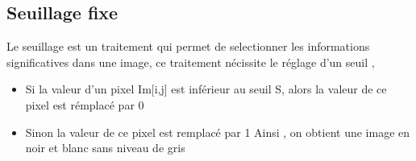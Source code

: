 \documentclass[letterpaper,10pt,english]{jupyterBook}
\begin{document}
\begin{sphinxVerbatimOutput}

\begin{sphinxVerbatim}
\end{sphinxVerbatim}

\noindent{}
\end{sphinxVerbatimOutput}


\subsection{Seuillage fixe}
\label{\detokenize{notebooks/images/TRAITEMENT-DES-IMAGES:seuillage-fixe}}
\sphinxAtStartPar
Le seuillage est un traitement qui permet de selectionner les informations significatives dans une image, ce traitement nécissite le réglage d’un seuil ,
\begin{itemize}
\item {} 
\sphinxAtStartPar
Si la valeur d’un pixel Im{[}i,j{]} est inférieur au seuil S, alors la valeur de ce pixel est rémplacé  par 0

\item {} 
\sphinxAtStartPar
Sinon la valeur de ce pixel est remplacé par 1
Ainsi , on obtient une image en noir et blanc sans niveau de gris

\end{itemize}
\begin{sphinxVerbatimInput}

\begin{sphinxVerbatim}[commandchars=\\\{\}]
 
    \PYG{p}{[}\PYG{p}{]}
       
           \PYG{p}{[}\PYG{p}{]}
            \PYG{p}{[}\PYG{p}{]}  \PYG{p}{[}\PYG{p}{]}  
     
\end{sphinxVerbatim}
\end{sphinxVerbatimInput}
\end{document}
